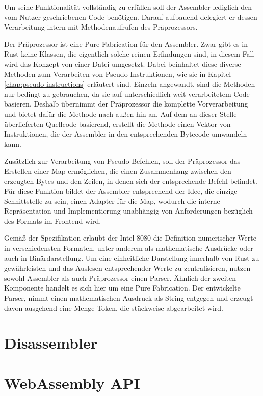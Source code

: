 Um seine Funktionalität vollständig zu erfüllen soll der Assembler lediglich den vom Nutzer geschriebenen Code benötigen. Darauf aufbauend delegiert er dessen Verarbeitung intern mit Methodenaufrufen des Präprozessors.

Der Präprozessor ist eine \glqq Pure Fabrication\grqq{} für den Assembler. Zwar gibt es in Rust keine Klassen, die eigentlich solche reinen Erfindungen sind, in diesem Fall wird das Konzept von einer Datei umgesetzt. Dabei beinhaltet diese diverse Methoden zum Verarbeiten von Pseudo-Instruktionen, wie sie in Kapitel \ref{chap:pseudo-instructions} erläutert sind. Einzeln angewandt, sind die Methoden nur bedingt zu gebrauchen, da sie auf unterschiedlich weit verarbeitetem Code basieren. Deshalb übernimmt der Präprozessor die komplette Vorverarbeitung und bietet dafür die Methode  nach außen hin an. Auf dem an dieser Stelle überlieferten Quellcode basierend, erstellt die Methode einen Vektor von Instruktionen, die der Assembler in den entsprechenden Bytecode umwandeln kann.

Zusätzlich zur Verarbeitung von Pseudo-Befehlen, soll der Präprozessor das Erstellen einer Map ermöglichen, die einen Zusammenhang zwischen den erzeugten Bytes und den Zeilen, in denen sich der entsprechende Befehl befindet. Für diese Funktion bildet der Assembler entsprechend der Idee, die einzige Schnittstelle zu sein, einen Adapter für die Map, wodurch die interne Repräsentation und Implementierung unabhängig von Anforderungen bezüglich des Formats im Frontend wird.

Gemäß der Spezifikation erlaubt der Intel 8080 die Definition numerischer Werte in verschiedensten Formaten, unter anderem als mathematische Ausdrücke oder auch in Binärdarstellung. Um eine einheitliche Darstellung innerhalb von Rust zu gewährleisten und das Auslesen entsprechender Werte zu zentralisieren, nutzen sowohl Assembler als auch Präprozessor einen Parser. Ähnlich der zweiten Komponente handelt es sich hier um eine Pure Fabrication. Der entwickelte Parser, nimmt einen mathematischen Ausdruck als String entgegen und erzeugt davon ausgehend eine Menge Token, die stückweise abgearbeitet wird.

\section{Disassembler}

\section{WebAssembly API}

